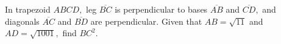 In trapezoid $ABCD,$ leg $\overline{BC}$ is perpendicular to bases $\overline{AB}$ and $\overline{CD},$ and diagonals $\overline{AC}$ and $\overline{BD}$ are perpendicular.  Given that $AB=\sqrt{11}$ and $AD=\sqrt{1001},$ find $BC^2.$
